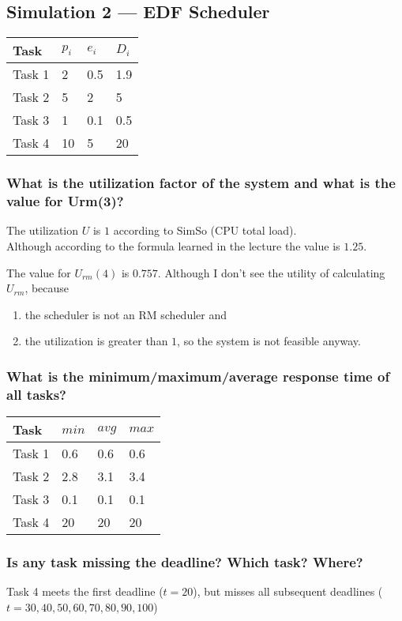 \documentclass{article}
\begin{document}
\subsection{Simulation 2 --- EDF Scheduler}

\begin{tabular}{|l||l|l|l|}
\hline
Task   & $p_i$ & $e_i$ & $D_i$ \\
\hline
\hline
Task 1 & 2 & 0.5 & 1.9 \\
\hline
Task 2 & 5 & 2 & 5 \\
\hline
Task 3 & 1 & 0.1 & 0.5 \\
\hline
Task 4 & 10 & 5 & 20 \\
\hline
\end{tabular}

\subsubsection{What is the utilization factor of the system and what is the value for Urm(3)?}
The utilization $U$ is $1$ according to SimSo (CPU total load). \\
Although according to the formula learned in the lecture the value is $1.25$.

The value for $U_{rm}(4)$ is $0.757$. Although I don’t see the utility of calculating $U_{rm}$, because
\begin{enumerate}
\item the scheduler is not an RM scheduler and
\item the utilization is greater than $1$, so the system is not feasible anyway.
\end{enumerate}

\subsubsection{What is the minimum/maximum/average response time of all tasks?}

\begin{tabular}{|l||l|l|l|}
\hline
Task   & $min$ & $avg$ & $max$ \\
\hline
\hline
Task 1 & 0.6 & 0.6 & 0.6 \\
\hline
Task 2 & 2.8 & 3.1 & 3.4 \\
\hline
Task 3 & 0.1 & 0.1 & 0.1 \\
\hline
Task 4 & 20 & 20 & 20 \\
\hline
\end{tabular}

\subsubsection{Is any task missing the deadline? Which task? Where?}
Task 4 meets the first deadline ($t = 20$),
but misses all subsequent deadlines ($t = 30, 40 , 50, 60, 70, 80, 90, 100$)
\end{document}
